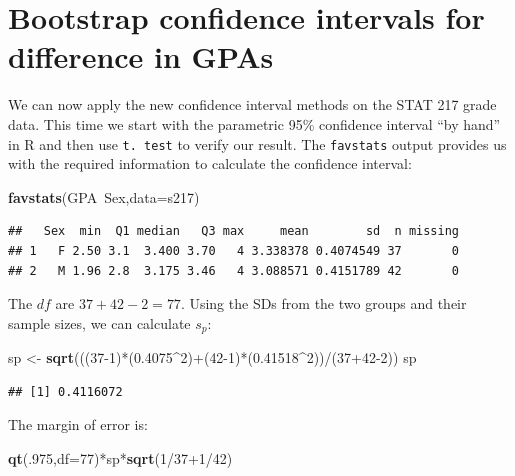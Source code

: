 \documentclass[]{book}
\newenvironment{Shaded}{\begin{snugshade}}{\end{snugshade}}
\newcommand{\KeywordTok}[1]{\textcolor[rgb]{0.13,0.29,0.53}{\textbf{{#1}}}}
\newcommand{\DataTypeTok}[1]{\textcolor[rgb]{0.13,0.29,0.53}{{#1}}}
\newcommand{\DecValTok}[1]{\textcolor[rgb]{0.00,0.00,0.81}{{#1}}}
\newcommand{\FloatTok}[1]{\textcolor[rgb]{0.00,0.00,0.81}{{#1}}}
\newcommand{\StringTok}[1]{\textcolor[rgb]{0.31,0.60,0.02}{{#1}}}
\newcommand{\NormalTok}[1]{{#1}}
\begin{document}
\section{Bootstrap confidence intervals for difference in
GPAs}\label{section2-9}

We can now apply the new confidence interval methods on the STAT 217
grade data. This time we start with the parametric 95\% confidence
interval ``by hand'' in R and then use \texttt{t.\ test} to verify our
result. The \texttt{favstats} output provides us with the required
information to calculate the confidence interval:

\begin{Shaded}
\begin{Highlighting}[]
\KeywordTok{favstats}\NormalTok{(GPA~Sex,}\DataTypeTok{data=}\NormalTok{s217)}
\end{Highlighting}
\end{Shaded}

\begin{verbatim}
##   Sex  min  Q1 median   Q3 max     mean        sd  n missing
## 1   F 2.50 3.1  3.400 3.70   4 3.338378 0.4074549 37       0
## 2   M 1.96 2.8  3.175 3.46   4 3.088571 0.4151789 42       0
\end{verbatim}

The \(df\) are \(37+42-2 = 77\). Using the SDs from the two groups and
their sample sizes, we can calculate \(s_p\):

\begin{Shaded}
\begin{Highlighting}[]
\NormalTok{sp <-}\StringTok{ }\KeywordTok{sqrt}\NormalTok{(((}\DecValTok{37-1}\NormalTok{)*(}\FloatTok{0.4075}\NormalTok{^}\DecValTok{2}\NormalTok{)+(}\DecValTok{42-1}\NormalTok{)*(}\FloatTok{0.41518}\NormalTok{^}\DecValTok{2}\NormalTok{))/(}\DecValTok{37+42-2}\NormalTok{))}
\NormalTok{sp}
\end{Highlighting}
\end{Shaded}

\begin{verbatim}
## [1] 0.4116072
\end{verbatim}

The margin of error is:

\begin{Shaded}
\begin{Highlighting}[]
\KeywordTok{qt}\NormalTok{(.}\DecValTok{975}\NormalTok{,}\DataTypeTok{df=}\DecValTok{77}\NormalTok{)*sp*}\KeywordTok{sqrt}\NormalTok{(}\DecValTok{1}\NormalTok{/}\DecValTok{37+1}\NormalTok{/}\DecValTok{42}\NormalTok{)}
\end{Highlighting}
\end{Shaded}
\end{document}
